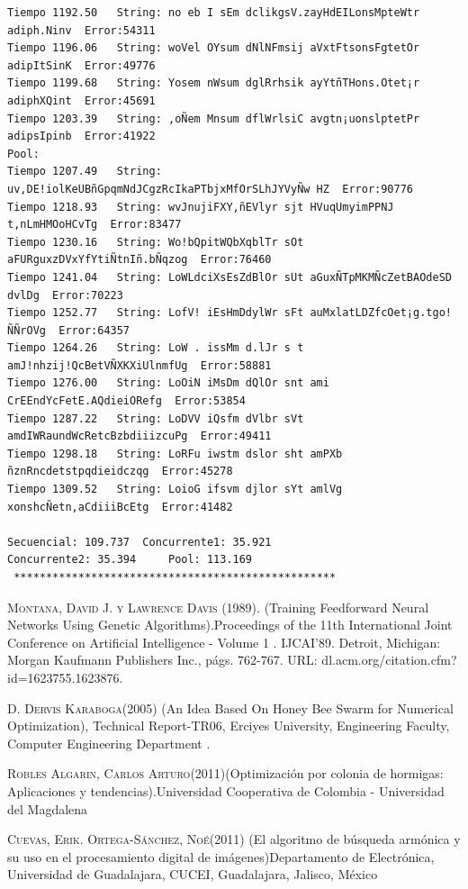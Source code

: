 \documentclass[a4paper,twocolumn,10pt]{article}
\begin{document}
\begin{center}
{\begin{verbatim}
Tiempo 1192.50	 String: no eb I sEm dclikgsV.zayHdEILonsMpteWtr adiph.Ninv	 Error:54311
Tiempo 1196.06	 String: woVel OYsum dNlNFmsij aVxtFtsonsFgtetOr adipItSinK	 Error:49776
Tiempo 1199.68	 String: Yosem nWsum dglRrhsik ayYtñTHons.Otet¡r adiphXQint	 Error:45691
Tiempo 1203.39	 String: ,oÑem Mnsum dflWrlsiC avgtn¡uonslptetPr adipsIpinb	 Error:41922
Pool:
Tiempo 1207.49	 String: uv,DE!iolKeUBñGpqmNdJCgzRcIkaPTbjxMfOrSLhJYVyÑw HZ	 Error:90776
Tiempo 1218.93	 String: wvJnujiFXY,ñEVlyr sjt HVuqUmyimPPNJ t,nLmHMOoHCvTg	 Error:83477
Tiempo 1230.16	 String: Wo!bQpitWQbXqblTr sOt aFURguxzDVxYfYtiÑtnIñ.bÑqzog	 Error:76460
Tiempo 1241.04	 String: LoWLdciXsEsZdBlOr sUt aGuxÑTpMKMÑcZetBAOdeSD dvlDg	 Error:70223
Tiempo 1252.77	 String: LofV! iEsHmDdylWr sFt auMxlatLDZfcOet¡g.tgo!ÑÑrOVg	 Error:64357
Tiempo 1264.26	 String: LoW . issMm d.lJr s t amJ!nhzij!QcBetVÑXKXiUlnmfUg	 Error:58881
Tiempo 1276.00	 String: LoOiN iMsDm dQlOr snt ami CrEEndYcFetE.AQdieiORefg	 Error:53854
Tiempo 1287.22	 String: LoDVV iQsfm dVlbr sVt amdIWRaundWcRetcBzbdiiizcuPg	 Error:49411
Tiempo 1298.18	 String: LoRFu iwstm dslor sht amPXb ñznRncdetstpqdieidczqg	 Error:45278
Tiempo 1309.52	 String: LoioG ifsvm djlor sYt amlVg xonshcÑetn,aCdiiiBcEtg	 Error:41482

Secuencial: 109.737	 Concurrente1: 35.921
Concurrente2: 35.394	 Pool: 113.169 
 **************************************************

\end{verbatim}}
\end{center}


\twocolumn




\begin{thebibliography}{X}


 \textsc{Montana, David J. y Lawrence Davis (1989).} (Training Feedforward Neural Networks Using Genetic Algorithms).Proceedings of the 11th International Joint
Conference on Artificial Intelligence - Volume 1 . IJCAI’89. Detroit, Michigan:
Morgan Kaufmann Publishers Inc., págs. 762-767. URL:
dl.acm.org/citation.cfm?id=1623755.1623876.



\bibitem{} \textsc{D. Dervis Karaboga(2005)} (An Idea Based On Honey Bee Swarm for Numerical Optimization), Technical Report-TR06, Erciyes University, Engineering Faculty, Computer Engineering Department .

 \textsc{Robles Algarin, Carlos Arturo(2011)}(Optimización por colonia de hormigas: Aplicaciones y tendencias).Universidad Cooperativa de Colombia - Universidad del Magdalena


 \textsc{Cuevas, Erik. Ortega-Sánchez, Noé(2011)} (El algoritmo de búsqueda armónica y su uso en el procesamiento digital de imágenes)Departamento de Electrónica, Universidad de Guadalajara, CUCEI, Guadalajara, Jalisco, México











\end{thebibliography}
\end{document}
